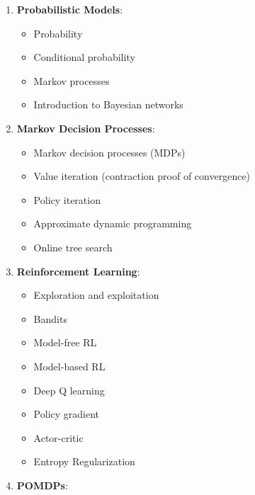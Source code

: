 \documentclass[9pt]{article}
\begin{document}
\begin{enumerate}[noitemsep]
    \item \textbf{Probabilistic Models}:
        \begin{multicols}{2}
            \begin{itemize}[noitemsep]
                \item Probability
                \item Conditional probability
                \item Markov processes
                \item Introduction to Bayesian networks
            \end{itemize}
        \end{multicols}
    \item \textbf{Markov Decision Processes}:
        \begin{multicols}{2}
        \begin{itemize}[noitemsep]
            \item Markov decision processes (MDPs)
            \item Value iteration (contraction proof of convergence)
            \item Policy iteration
            \item Approximate dynamic programming
            \item Online tree search
        \end{itemize}
        \end{multicols}
    \item \textbf{Reinforcement Learning}:
        \begin{multicols}{2}
        \begin{itemize}[noitemsep]
            \item Exploration and exploitation
            \item Bandits
            \item Model-free RL
            \item Model-based RL
            \item Deep Q learning
            \item Policy gradient
            \item Actor-critic
            \item Entropy Regularization
        \end{itemize}
        \end{multicols}
    \item \textbf{POMDPs}:
        \begin{multicols}{2}

\end{multicols}
\end{enumerate}
\end{document}
